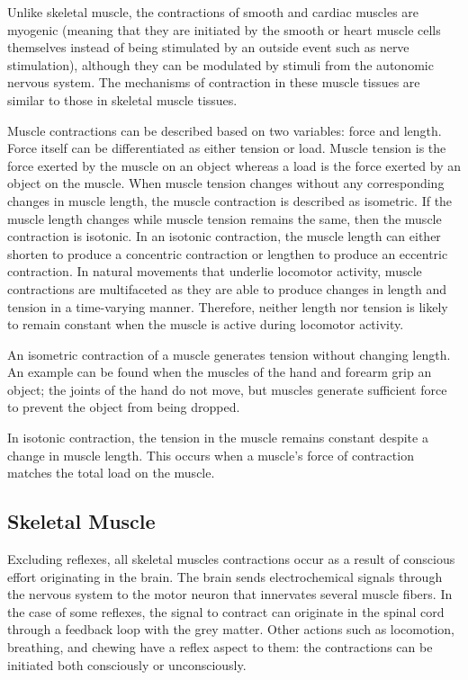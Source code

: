 Unlike skeletal muscle, the contractions of smooth and cardiac muscles are myogenic (meaning that they are initiated by the smooth or heart muscle cells themselves instead of being stimulated by an outside event such as nerve stimulation), although they can be modulated by stimuli from the autonomic nervous system. The mechanisms of contraction in these muscle tissues are similar to those in skeletal muscle tissues.

Muscle contractions can be described based on two variables: force and length. Force itself can be differentiated as either tension or load. Muscle tension is the force exerted by the muscle on an object whereas a load is the force exerted by an object on the muscle. When muscle tension changes without any corresponding changes in muscle length, the muscle contraction is described as isometric. If the muscle length changes while muscle tension remains the same, then the muscle contraction is isotonic. In an isotonic contraction, the muscle length can either shorten to produce a concentric contraction or lengthen to produce an eccentric contraction. In natural movements that underlie locomotor activity, muscle contractions are multifaceted as they are able to produce changes in length and tension in a time-varying manner. Therefore, neither length nor tension is likely to remain constant when the muscle is active during locomotor activity.

An isometric contraction of a muscle generates tension without changing length. An example can be found when the muscles of the hand and forearm grip an object; the joints of the hand do not move, but muscles generate sufficient force to prevent the object from being dropped.

In isotonic contraction, the tension in the muscle remains constant despite a change in muscle length. This occurs when a muscle's force of contraction matches the total load on the muscle.

\hypertarget{skeletal-muscle}{%
\subsection{Skeletal Muscle}\label{skeletal-muscle}}

Excluding reflexes, all skeletal muscles contractions occur as a result of conscious effort originating in the brain. The brain sends electrochemical signals through the nervous system to the motor neuron that innervates several muscle fibers. In the case of some reflexes, the signal to contract can originate in the spinal cord through a feedback loop with the grey matter. Other actions such as locomotion, breathing, and chewing have a reflex aspect to them: the contractions can be initiated both consciously or unconsciously.


